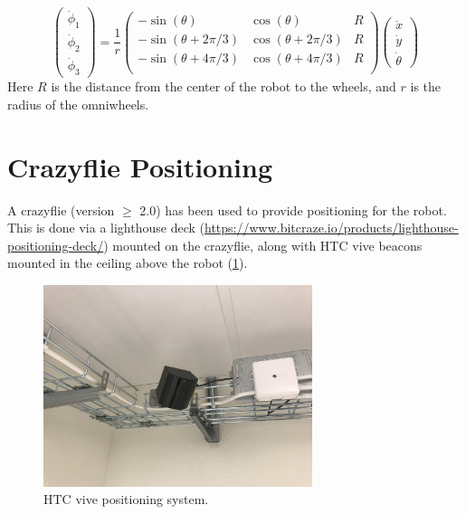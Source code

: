 \documentclass[10pt,a4paper]{article}
\begin{document}
	\begin{equation}
		\begin{pmatrix}
			\dot{\phi}_1 \\ \dot{\phi}_2 \\ \dot{\phi}_3
		\end{pmatrix} = \frac{1}{r}\begin{pmatrix}
		-\sin(\theta) & \cos(\theta) & R \\
		-\sin(\theta +2\pi/3) & \cos(\theta +2\pi/3) & R \\
		-\sin(\theta +4\pi/3) & \cos(\theta +4\pi/3) & R \\
		\end{pmatrix} \begin{pmatrix}
			\dot{x} \\ \dot{y} \\ \dot{\theta}
		\end{pmatrix}
	\end{equation}
	Here $R$ is the distance from the center of the robot to the wheels, and $r$ is the radius of the omniwheels.
	
	\section{Crazyflie Positioning}
	
	A crazyflie (version $\geq$ 2.0) has been used to provide positioning for the robot. This is done via a lighthouse deck (\url{https://www.bitcraze.io/products/lighthouse-positioning-deck/}) mounted on the crazyflie, along with HTC vive beacons mounted in the ceiling above the robot (\ref{fig:beacon}). 
	
	\begin{figure}[h]
		\centering
		\includegraphics[width=0.7\textwidth]{figs/beacon}
		\caption{HTC vive positioning system.}
		\label{fig:beacon}
	\end{figure}
	
\end{document}
